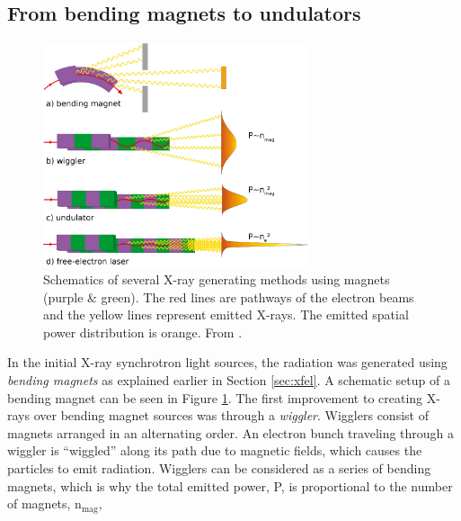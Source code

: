 \subsection{From bending magnets to undulators}\label{sec:undulator}
\begin{figure}[t]
	\centering
	\includegraphics[width=0.70\textwidth]{images/bending-to-FEL.png}
	\caption[Schematics of several X-ray generating methods.]{Schematics of several X-ray generating methods using magnets (purple \& green). The red lines are pathways of the electron beams and the yellow lines represent emitted X-rays. The emitted spatial power distribution is orange. From \citep[\href{http://creativecommons.org/licenses/by-nc-nd/3.0/de/}{\ccbyncndeu}]{Rupp-2013-Thesis}.}
	\label{fig:undulator}
\end{figure}
In the initial X-ray synchrotron light sources, the radiation was generated using \textit{bending magnets} as explained earlier in Section \ref{sec:xfel}. A schematic setup of a bending magnet can be seen in Figure \ref{fig:undulator}. The first improvement to creating X-rays over bending magnet sources was through a \textit{wiggler}. Wigglers consist of magnets arranged in an alternating order. An electron bunch traveling through a wiggler is ``wiggled'' along its path due to magnetic fields, which causes the particles to emit radiation. Wigglers can be considered as a series of bending magnets, which is why the total emitted power, P, is proportional to the number of magnets, n$_{\text{mag}}$, \citep{Brown-1983-NIMPR}
